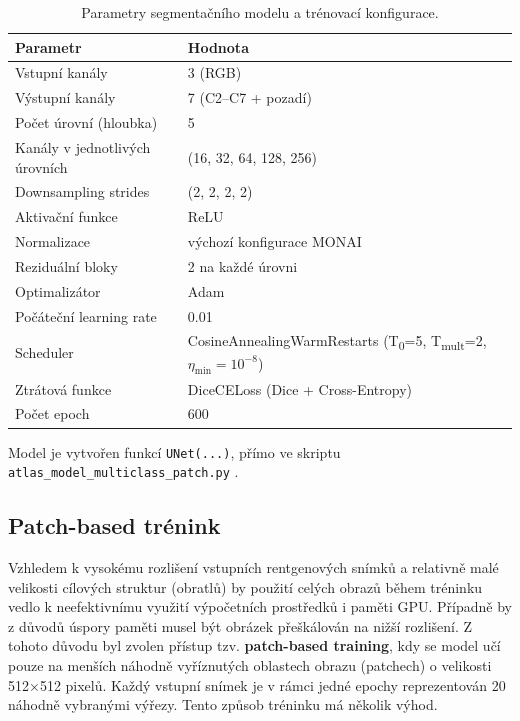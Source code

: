 \documentclass[male,czech,api_bc]{kitheses}
\begin{document}
\begin{table}[H]
\centering
\caption{Parametry segmentačního modelu a trénovací konfigurace.}
\label{tab:unet_arch_train}
\begin{tabular}{p{5.2cm} p{8cm}}
\toprule
\textbf{Parametr} & \textbf{Hodnota} \\
\midrule
Vstupní kanály & 3 (RGB) \\
Výstupní kanály & 7 (C2–C7 + pozadí) \\
Počet úrovní (hloubka) & 5 \\
Kanály v jednotlivých úrovních & (16, 32, 64, 128, 256) \\
Downsampling strides & (2, 2, 2, 2) \\
Aktivační funkce & ReLU \\
Normalizace & výchozí konfigurace MONAI \\
Reziduální bloky & 2 na každé úrovni \\
Optimalizátor & Adam \\
Počáteční learning rate & 0.01 \\
Scheduler & CosineAnnealingWarmRestarts \cite{Loshchilov2017} (T\textsubscript{0}=5, T\textsubscript{mult}=2, $\eta_{\min}=10^{-8}$) \\
Ztrátová funkce & DiceCELoss (Dice + Cross-Entropy) \\
Počet epoch & 600 \\
\bottomrule
\end{tabular}
\end{table}

Model je vytvořen funkcí \texttt{UNet(...)}, přímo ve skriptu \texttt{atlas\_model\-\_multiclass\-\_patch.py} .

\subsection*{Patch-based trénink}

Vzhledem k vysokému rozlišení vstupních rentgenových snímků a relativně malé velikosti cílových struktur (obratlů) by použití celých obrazů během tréninku vedlo k neefektivnímu využití výpočetních prostředků i paměti GPU. Případně by z důvodů úspory paměti musel být obrázek přeškálován na nižší rozlišení. Z tohoto důvodu byl zvolen přístup tzv. \textbf{patch-based training}, kdy se model učí pouze na menších náhodně vyříznutých oblastech obrazu (patchech) o velikosti 512×512 pixelů. Každý vstupní snímek je v rámci jedné epochy reprezentován 20 náhodně vybranými výřezy. Tento způsob tréninku má několik výhod.
\end{document}
